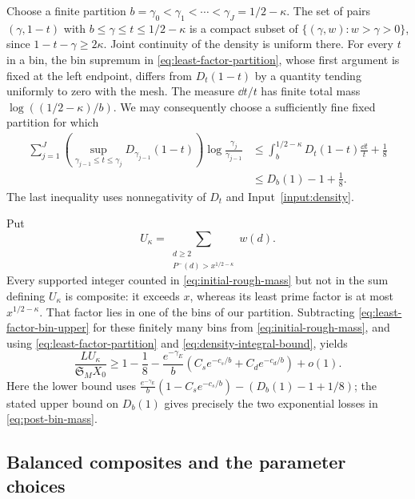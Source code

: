 Choose a finite partition
$b=\gamma_0<\gamma_1<\cdots<\gamma_J=1/2-\kappa$.
The set of pairs $(\gamma,1-t)$ with
$b\le\gamma\le t\le1/2-\kappa$ is a compact subset of
$\{(\gamma,w):w>\gamma>0\}$, since $1-t-\gamma\ge2\kappa$.
Joint continuity of the density is uniform there.  For every $t$ in a bin,
the bin supremum in \eqref{eq:least-factor-partition}, whose first argument
is fixed at the left endpoint, differs from $D_t(1-t)$ by a quantity
tending uniformly to zero with the mesh.  The measure $\dd t/t$ has finite total mass
$\log((1/2-\kappa)/b)$.  We may consequently choose a sufficiently
fine fixed partition for which
\begin{equation}\label{eq:least-factor-partition}
 \begin{split}
 \sum_{j=1}^J
  \left(\sup_{\gamma_{j-1}\le t\le\gamma_j}
                     D_{\gamma_{j-1}}(1-t)\right)
             \log\frac{\gamma_j}{\gamma_{j-1}}
 &\le\int_b^{1/2-\kappa}D_t(1-t)\frac{\dd t}{t}+\frac18\\
 &\le D_b(1)-1+\frac18.
 \end{split}
\end{equation}
The last inequality uses nonnegativity of $D_t$ and
Input~\ref{input:density}.

Put
\[
 U_\kappa=\sum_{\substack{d\ge2\\P^-(d)>x^{1/2-\kappa}}}w(d).
\]
Every supported integer counted in \eqref{eq:initial-rough-mass}
but not in the sum defining $U_\kappa$ is composite: it exceeds $x$,
whereas its
least prime factor is at most $x^{1/2-\kappa}$.  That factor lies
in one of the bins of our partition.  Subtracting
\eqref{eq:least-factor-bin-upper} for these finitely many bins from
\eqref{eq:initial-rough-mass}, and using
\eqref{eq:least-factor-partition} and
\eqref{eq:density-integral-bound}, yields
\begin{equation}\label{eq:post-bin-mass}
 \frac{LU_\kappa}{\mathfrak S_M X_0}
 \ge1-\frac18-\frac{e^{-\gamma_E}}{b}
       \left(C_se^{-c_s/b}+C_de^{-c_d/b}\right)+o(1).
\end{equation}
Here the lower bound uses
$\frac{e^{-\gamma_E}}b(1-C_se^{-c_s/b})-
 (D_b(1)-1+1/8)$; the stated upper bound on $D_b(1)$ gives precisely
the two exponential losses in \eqref{eq:post-bin-mass}.

\subsection{Balanced composites and the parameter choices}

